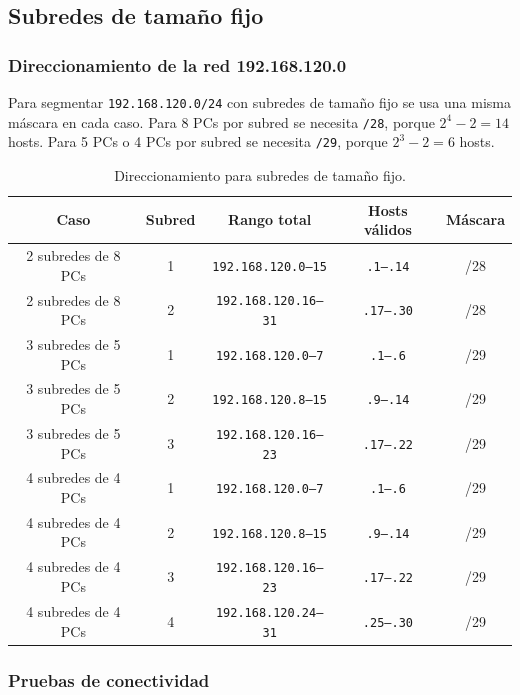 \documentclass[a4paper,12pt]{article}
\newcommand{\ip}[1]{\mbox{\texttt{#1}}}
\begin{document}


\subsection{Subredes de tamaño fijo}

\subsubsection{Direccionamiento de la red 192.168.120.0}

Para segmentar \ip{192.168.120.0/24} con subredes de tamaño fijo se usa una misma máscara en cada caso. Para 8 PCs por subred se necesita \ip{/28}, porque $2^4 - 2 = 14$ hosts. Para 5 PCs o 4 PCs por subred se necesita \ip{/29}, porque $2^3 - 2 = 6$ hosts.

\begin{table}[H]
\centering
\small
\begin{tabular}{|c|c|c|c|c|}
\hline
Caso & Subred & Rango total & Hosts válidos & Máscara \\
\hline
2 subredes de 8 PCs & 1 & \ip{192.168.120.0--15} & \ip{.1--.14} & /28 \\
2 subredes de 8 PCs & 2 & \ip{192.168.120.16--31} & \ip{.17--.30} & /28 \\
3 subredes de 5 PCs & 1 & \ip{192.168.120.0--7} & \ip{.1--.6} & /29 \\
3 subredes de 5 PCs & 2 & \ip{192.168.120.8--15} & \ip{.9--.14} & /29 \\
3 subredes de 5 PCs & 3 & \ip{192.168.120.16--23} & \ip{.17--.22} & /29 \\
4 subredes de 4 PCs & 1 & \ip{192.168.120.0--7} & \ip{.1--.6} & /29 \\
4 subredes de 4 PCs & 2 & \ip{192.168.120.8--15} & \ip{.9--.14} & /29 \\
4 subredes de 4 PCs & 3 & \ip{192.168.120.16--23} & \ip{.17--.22} & /29 \\
4 subredes de 4 PCs & 4 & \ip{192.168.120.24--31} & \ip{.25--.30} & /29 \\
\hline
\end{tabular}
\caption{Direccionamiento para subredes de tamaño fijo.}
\end{table}

\subsubsection{Pruebas de conectividad}
\end{document}
